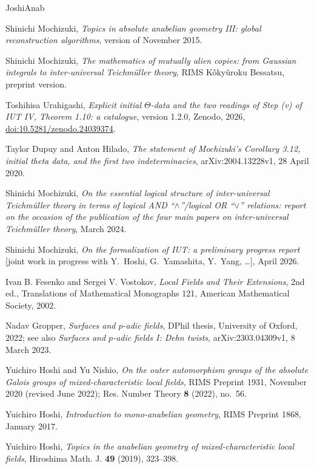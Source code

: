 \documentclass[11pt,a4paper]{article}
\theoremstyle{plain}
\theoremstyle{definition}
\theoremstyle{remark}
\begin{document}
\begin{thebibliography}{JoshiAnab}\raggedright
{}
Shinichi Mochizuki, \emph{Topics in absolute anabelian geometry III: global reconstruction algorithms}, version of
November 2015.

Shinichi Mochizuki, \emph{The mathematics of mutually alien copies: from Gaussian integrals to inter-universal
Teichm\"uller theory}, RIMS K\^oky\^uroku Bessatsu, preprint version.

Toshihisa Urahigashi, \emph{Explicit initial $\Theta$-data and the two readings of Step (v) of IUT IV, Theorem 1.10:
a catalogue}, version 1.2.0, Zenodo, 2026, \href{https://doi.org/10.5281/zenodo.24039374}{doi:10.5281/zenodo.24039374}.

Taylor Dupuy and Anton Hilado, \emph{The statement of Mochizuki's Corollary 3.12, initial theta data, and the first two
indeterminacies}, arXiv:2004.13228v1, 28 April 2020.

Shinichi Mochizuki, \emph{On the essential logical structure of inter-universal Teichm\"uller theory in terms of
logical AND ``$\wedge$''/logical OR ``$\vee$'' relations: report on the occasion of the publication of the four main
papers on inter-universal Teichm\"uller theory}, March 2024.

Shinichi Mochizuki, \emph{On the formalization of IUT: a preliminary progress report} [joint work in progress with
Y.~Hoshi, G.~Yamashita, Y.~Yang, \dots], April 2026.

Ivan B. Fesenko and Sergei V. Vostokov, \emph{Local Fields and Their Extensions}, 2nd ed., Translations of
Mathematical Monographs 121, American Mathematical Society, 2002.

Nadav Gropper, \emph{Surfaces and $p$-adic fields}, DPhil thesis, University of Oxford, 2022; see also
\emph{Surfaces and $p$-adic fields I: Dehn twists}, arXiv:2303.04309v1, 8 March 2023.

Yuichiro Hoshi and Yu Nishio, \emph{On the outer automorphism groups of the absolute Galois groups of
mixed-characteristic local fields}, RIMS Preprint 1931, November 2020 (revised June 2022); Res. Number Theory
\textbf{8} (2022), no.~56.

Yuichiro Hoshi, \emph{Introduction to mono-anabelian geometry}, RIMS Preprint 1868, January 2017.

Yuichiro Hoshi, \emph{Topics in the anabelian geometry of mixed-characteristic local fields}, Hiroshima Math. J.
\textbf{49} (2019), 323--398.


\end{thebibliography}
\end{document}
